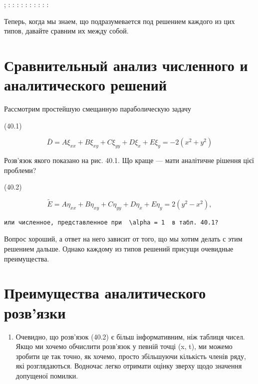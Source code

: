 \documentclass[
  ukrainian,
]{article}
\providecommand{\tightlist}{%
  \setlength{\itemsep}{0pt}\setlength{\parskip}{0pt}}
\begin{document}
; \textbar{} \textbar{} : \textbar{} : \textbar{} : \textbar{} :
\textbar{} : \textbar{} : \textbar{} : \textbar{} : \textbar{} :
\textbar{} : \textbar{}

Теперь, когда мы знаем, що подразумевается под решением каждого из цих
типов, давайте сравним их между собой.

\section{\texorpdfstring{\textbf{Сравнительный анализ численного} и
аналитического
решений}{Сравнительный анализ численного и аналитического решений}}\label{ux441ux440ux430ux432ux43dux438ux442ux435ux43bux44cux43dux44bux439-ux430ux43dux430ux43bux438ux437-ux447ux438ux441ux43bux435ux43dux43dux43eux433ux43e-ux438-ux430ux43dux430ux43bux438ux442ux438ux447ux435ux441ux43aux43eux433ux43e-ux440ux435ux448ux435ux43dux438ux439}

Рассмотрим простейшую смещанную параболическую задачу

(40.1)

\[
\bar{D} = A\xi_{xx} + B\xi_{xy} + C\xi_{yy} + D\xi_x + E\xi_y = -2(x^2 + y^2)
\]

Розв'язок якого показано на рис. 40.1. Що краще --- мати аналітичне
рішення цієї проблеми?

(40.2)

\[
\widetilde{E} = A\eta_{xx} + B\eta_{xy} + C\eta_{yy} + D\eta_x + E\eta_y = 2(y^2 - x^2),
\]

\begin{verbatim}
или численное, представленное при  \alpha = 1  в табл. 40.1?
\end{verbatim}

Вопрос хороший, а ответ на него зависит от того, що мы хотим делать с
этим решением дальше. Однако каждому из типов решений присущи очевидные
преимущества.

\section{Преимущества аналитического
розв'язки}\label{ux43fux440ux435ux438ux43cux443ux449ux435ux441ux442ux432ux430-ux430ux43dux430ux43bux438ux442ux438ux447ux435ux441ux43aux43eux433ux43e-ux440ux43eux437ux432ux44fux437ux43aux438}

\begin{enumerate}
\def\labelenumi{\arabic{enumi}.}
\tightlist
\item
  Очевидно, що розв'язок (40.2) є більш інформативним, ніж таблиця
  чисел. Якщо ми хочемо обчислити розв'язок у певній точці (x, t), ми
  можемо зробити це так точно, як хочемо, просто збільшуючи кількість
  членів ряду, які розглядаються. Водночас легко отримати оцінку зверху
  щодо значення допущеної помилки.
\end{enumerate}
\end{document}
